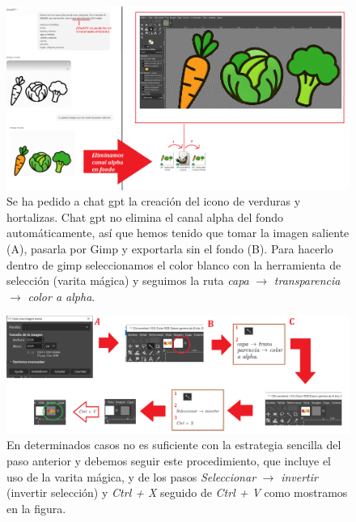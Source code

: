 \documentclass[a4paper,12pt]{report}
\begin{document}
\FloatBarrier
\setlength{\belowcaptionskip}{3pt}
\begin{figure}[H]
	\centering
	\caption{Se ha pedido a chat gpt la creación del icono de verduras y hortalizas. Chat gpt no elimina el canal alpha del fondo automáticamente, así que hemos tenido que tomar la imagen saliente (A), pasarla por Gimp y exportarla  sin el fondo (B). Para hacerlo dentro de gimp seleccionamos el color blanco con la herramienta de selección (varita mágica) y seguimos la ruta \textit{capa} $\rightarrow$ \textit{transparencia} $\rightarrow$ \textit{color a alpha}.}
	\includegraphics[width=1\linewidth]{img/eliminoCanalAlpha}


	\label{fig:eliminocanalalpha}
\end{figure}
\FloatBarrier


\FloatBarrier
\setlength{\belowcaptionskip}{3pt}
\begin{figure}[H]
	\centering
	\caption{En determinados casos no es suficiente con la estrategia sencilla del paso anterior y debemos seguir este procedimiento, que incluye el uso de la varita mágica, y de los pasos \textit{Seleccionar} $\rightarrow$ \textit{invertir} (invertir selección) y \textit{Ctrl + X} seguido de \textit{Ctrl + V} como mostramos en la figura.} 
	\includegraphics[width=1\linewidth]{img/eliminoCanalAlphaCOMPLEX.png}

	
	\label{fig:eliminocanalalphaCOMPLEX}
\end{figure}
\FloatBarrier
\end{document}
